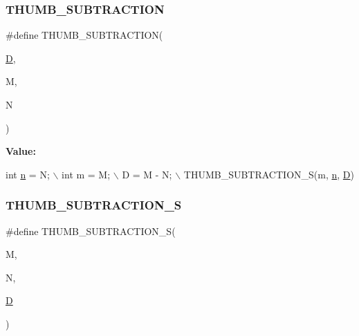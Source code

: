 \mbox{\label{isa-thumb_8c_a441cc37cc432849325c84952f3f0d7a7}} 
\subsubsection{\texorpdfstring{T\+H\+U\+M\+B\+\_\+\+S\+U\+B\+T\+R\+A\+C\+T\+I\+ON}{THUMB\_SUBTRACTION}}
{\footnotesize\ttfamily \#define T\+H\+U\+M\+B\+\_\+\+S\+U\+B\+T\+R\+A\+C\+T\+I\+ON(\begin{DoxyParamCaption}\item[{}]{\mbox{\hyperlink{_aes_8c_adef282f11138cda3d081cc21280a8d12}{D}},  }\item[{}]{M,  }\item[{}]{N }\end{DoxyParamCaption})}

{\bfseries Value\+:}
\begin{DoxyCode}
\textcolor{keywordtype}{int} \mbox{\hyperlink{isa-thumb_8c_a76f11d9a0a47b94f72c2d0e77fb32240}{n}} = N; \(\backslash\)
    int m = M; \(\backslash\)
    D = M - N; \(\backslash\)
    THUMB\_SUBTRACTION\_S(m, \mbox{\hyperlink{isa-thumb_8c_a76f11d9a0a47b94f72c2d0e77fb32240}{n}}, \mbox{\hyperlink{_aes_8c_adef282f11138cda3d081cc21280a8d12}{D}})
\end{DoxyCode}
\mbox{\label{isa-thumb_8c_a964e088efd4388ebafddbcd1572ce737}} 
\subsubsection{\texorpdfstring{T\+H\+U\+M\+B\+\_\+\+S\+U\+B\+T\+R\+A\+C\+T\+I\+O\+N\+\_\+S}{THUMB\_SUBTRACTION\_S}}
{\footnotesize\ttfamily \#define T\+H\+U\+M\+B\+\_\+\+S\+U\+B\+T\+R\+A\+C\+T\+I\+O\+N\+\_\+S(\begin{DoxyParamCaption}\item[{}]{M,  }\item[{}]{N,  }\item[{}]{\mbox{\hyperlink{_aes_8c_adef282f11138cda3d081cc21280a8d12}{D}} }\end{DoxyParamCaption})}

